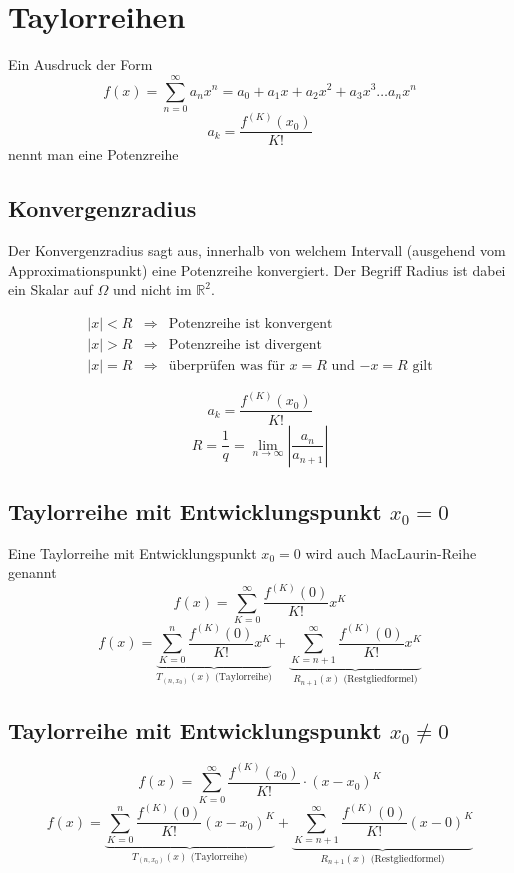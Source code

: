\section{Taylorreihen}
Ein Ausdruck der Form 
\[ \boxed{f(x) = \sum_{n = 0}^{\infty} a_n x^n = a_0 + a_1 x + a_2 x^2 + a_3 x^3 \dots a_n x^n} \]
\[ \boxed{a_k = \frac{f^{(K)}(x_0)}{K!}} \]
nennt man eine Potenzreihe

\subsection{Konvergenzradius}
Der Konvergenzradius sagt aus, innerhalb von welchem Intervall (ausgehend vom Approximationspunkt)
eine Potenzreihe konvergiert. Der Begriff Radius ist dabei ein Skalar auf $\Omega$ und nicht im $\mathbb{R}^2$.

\begin{figure}[h!]
\centering
\end{figure}

\[ \boxed{ \begin{array}{lll} 
    |x| < R & \Rightarrow & \text{Potenzreihe ist konvergent} \\
    |x| > R & \Rightarrow & \text{Potenzreihe ist divergent} \\
    |x| = R & \Rightarrow & \text{überprüfen was für $x=R$ und $-x=R$ gilt}
\end{array} } \]

\[ \boxed{a_k = \frac{f^{(K)}(x_0)}{K!}} \]
\[ \boxed{R = \frac{1}{q} = \lim_{n \rightarrow \infty} \left| \frac{a_n}{a_{n + 1}} \right|} \]

\subsection{Taylorreihe mit Entwicklungspunkt $x_0 = 0$}
Eine Taylorreihe mit Entwicklungspunkt $x_0 = 0$ wird auch MacLaurin-Reihe genannt
\[ \boxed{f(x) = \sum_{K=0}^{\infty}\frac{f^{(K)}(0)}{K!} x^K} \]
\[ \boxed{f(x) = \underbrace{\sum_{K=0}^{n}\frac{f^{(K)}(0)}{K!} x^K}_{T_{(n,x_0)}(x)\text{ (Taylorreihe)}} + \underbrace{\sum_{K=n+1}^{\infty}\frac{f^{(K)}(0)}{K!} x^K}_{R_{n+1}(x)\text{ (Restgliedformel)}}} \]

\subsection{Taylorreihe mit Entwicklungspunkt $x_0 \neq 0$}
\[ \boxed{f(x) = \sum_{K=0}^{\infty}\frac{f^{(K)}(x_0)}{K!}\cdot (x-x_0)^K} \]
\[ \boxed{f(x) = \underbrace{\sum_{K=0}^{n}\frac{f^{(K)}(0)}{K!} (x - x_0)^K}_{T_{(n,x_0)}(x)\text{ (Taylorreihe)}} + \underbrace{\sum_{K=n+1}^{\infty}\frac{f^{(K)}(0)}{K!} (x - 0)^K}_{R_{n+1}(x)\text{ (Restgliedformel)}}} \]

